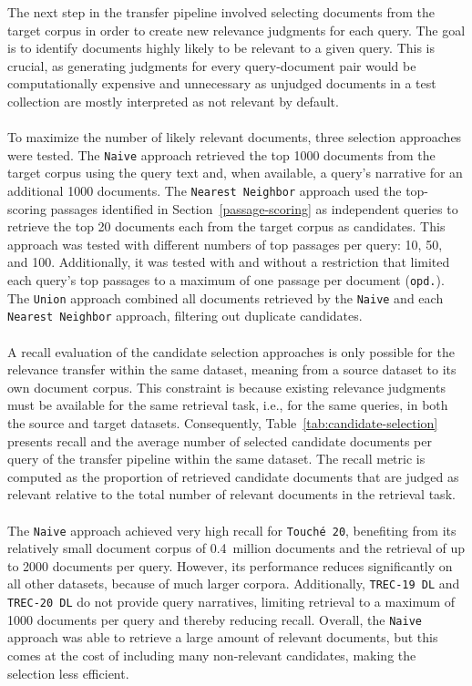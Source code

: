 \begin{table}[t]
{\begin{tabular}{ccrcrcrcrcrcrcr}
        \bottomrule 
    \end{tabular}}
    \renewcommand{\arraystretch}{1.0}
\end{table}

The next step in the transfer pipeline involved selecting documents from the target corpus in order to create new relevance judgments for each query. The goal is to identify documents highly likely to be relevant to a given query. This is crucial, as generating judgments for every query-document pair would be computationally expensive and unnecessary as unjudged documents in a test collection are mostly interpreted as not relevant by default.
\\\\
To maximize the number of likely relevant documents, three selection approaches were tested. The \texttt{Naive} approach retrieved the top 1000 documents from the target corpus using the query text and, when available, a query's narrative for an additional 1000 documents. The \texttt{Nearest Neighbor} approach used the top-scoring passages identified in Section~\ref{passage-scoring} as independent queries to retrieve the top 20 documents each from the target corpus as candidates. This approach was tested with different numbers of top passages per query: 10, 50, and 100. Additionally, it was tested with and without a restriction that limited each query's top passages to a maximum of one passage per document (\texttt{opd.}). The \texttt{Union} approach combined all documents retrieved by the \texttt{Naive} and each \texttt{Nearest Neighbor} approach, filtering out duplicate candidates.
\\\\
A recall evaluation of the candidate selection approaches is only possible for the relevance transfer within the same dataset, meaning from a source dataset to its own document corpus. This constraint is because existing relevance judgments must be available for the same retrieval task, i.e., for the same queries, in both the source and target datasets. Consequently, Table~\ref{tab:candidate-selection} presents recall and the average number of selected candidate documents per query of the transfer pipeline within the same dataset. The recall metric is computed as the proportion of retrieved candidate documents that are judged as relevant relative to the total number of relevant documents in the retrieval task.
\\\\
The \texttt{Naive} approach achieved very high recall for \texttt{Touché 20}, benefiting from its relatively small document corpus of 0.4~million documents and the retrieval of up to 2000 documents per query. However, its performance reduces significantly on all other datasets, because of much larger corpora. Additionally, \texttt{TREC-19 DL} and \texttt{TREC-20 DL} do not provide query narratives, limiting retrieval to a maximum of 1000 documents per query and thereby reducing recall. Overall, the \texttt{Naive} approach was able to retrieve a large amount of relevant documents, but this comes at the cost of including many non-relevant candidates, making the selection less efficient.
